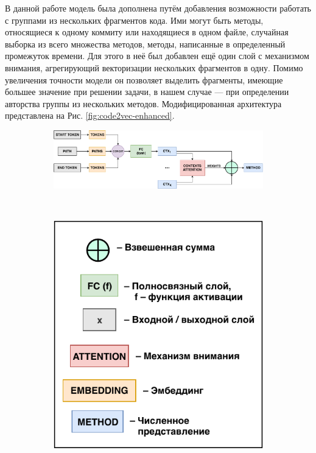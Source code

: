 В данной работе модель была дополнена путём добавления возможности работать с группами из нескольких фрагментов кода. Ими могут быть методы, относящиеся к одному коммиту или находящиеся в одном файле, случайная выборка из всего множества методов, методы, написанные в определенный промежуток времени. Для этого в неё был добавлен ещё один слой с механизмом внимания, агрегирующий векторизации нескольких фрагментов в одну. Помимо увеличения точности модели он позволяет выделить фрагменты, имеющие большее значение при решении задачи, в нашем случае — при определении авторства группы из нескольких методов. Модифицированная архитектура представлена на Рис. \ref{fig:code2vec-enhanced}.

    \begin{figure}[ht]
    \centering
       \begin{subfigure}{0.98\linewidth}
       \centering
       \includegraphics[width=\linewidth]{images/Code2VecOriginal.pdf}
       \caption{}
       \label{fig:code2vec-original} 
    \end{subfigure}
    \\[\baselineskip]
    \begin{subfigure}{0.34\linewidth}
       \centering
       \includegraphics[width=\linewidth]{images/Code2VecLegend.pdf}

\end{subfigure}
\end{figure}
